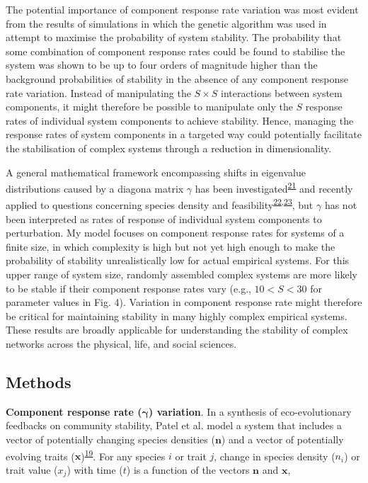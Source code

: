 \documentclass[]{article}
\begin{document}
The potential importance of component response rate variation was most
evident from the results of simulations in which the genetic algorithm
was used in attempt to maximise the probability of system stability. The
probability that some combination of component response rates could be
found to stabilise the system was shown to be up to four orders of
magnitude higher than the background probabilities of stability in the
absence of any component response rate variation. Instead of
manipulating the \(S \times S\) interactions between system components,
it might therefore be possible to manipulate only the \(S\) response
rates of individual system components to achieve stability. Hence,
managing the response rates of system components in a targeted way could
potentially facilitate the stabilisation of complex systems through a
reduction in dimensionality.

A general mathematical framework encompassing shifts in eigenvalue
distributions caused by a diagona matrix \(\gamma\) has been
investigated\textsuperscript{\protect\hyperlink{ref-Ahmadian2015}{21}}
and recently applied to questions concerning species density and
feasibility\textsuperscript{\protect\hyperlink{ref-Gibbs2017}{22},\protect\hyperlink{ref-Stone2017}{23}},
but \(\gamma\) has not been interpreted as rates of response of
individual system components to perturbation. My model focuses on
component response rates for systems of a finite size, in which
complexity is high but not yet high enough to make the probability of
stability unrealistically low for actual empirical systems. For this
upper range of system size, randomly assembled complex systems are more
likely to be stable if their component response rates vary (e.g.,
\(10 < S < 30\) for parameter values in Fig. 4). Variation in component
response rate might therefore be critical for maintaining stability in
many highly complex empirical systems. These results are broadly
applicable for understanding the stability of complex networks across
the physical, life, and social sciences.

\subsection{Methods}\label{methods}

\textbf{Component response rate (\(\mathbf{\gamma}\)) variation}. In a
synthesis of eco-evolutionary feedbacks on community stability, Patel et
al. model a system that includes a vector of potentially changing
species densities (\(\mathbf{n}\)) and a vector of potentially evolving
traits
(\(\mathbf{x}\))\textsuperscript{\protect\hyperlink{ref-Patel2018}{19}}.
For any species \(i\) or trait \(j\), change in species density
(\(n_{i}\)) or trait value (\(x_{j}\)) with time (\(t\)) is a function
of the vectors \(\mathbf{n}\) and \(\mathbf{x}\),
\end{document}
